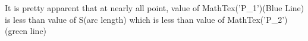\documentclass[preview]{standalone}
\begin{document}
\begin{center}
It is pretty apparent that at nearly all point, value of MathTex('P_1')(Blue Line) is less than value of S(arc length) which is less than value of MathTex('P_2')(green line)
\end{center}
\end{document}

